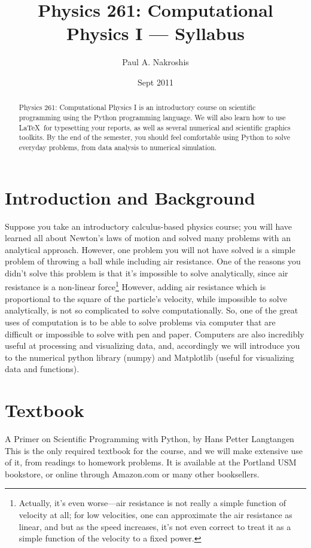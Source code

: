 \documentclass[justified]{tufte-handout}
\title{Physics 261: Computational Physics I --- Syllabus}
\author[Paul A. Nakroshis]{Paul A. Nakroshis}
\date{Sept 2011}  %
\begin{document}
\maketitle%

\begin{abstract}
\noindent Physics 261: Computational Physics I is an introductory course on
scientific programming using the Python programming language. We will also 
learn how to use \LaTeX\ for typesetting 
your reports, as well as several numerical and scientific graphics toolkits. By the 
end of the semester, you should feel comfortable using Python to solve everyday 
problems, from data analysis to numerical simulation. 
 \end{abstract}

\section{Introduction and Background}\label{sec:page-layout}
Suppose you take an introductory calculus-based physics course; you will 
have learned all about Newton's laws of motion and solved many problems
with an analytical approach. However, one problem you will not have solved
is a simple problem of throwing a ball while including air resistance. One of the reasons 
you didn't solve this problem is that it's impossible to solve analytically, since air resistance is 
a non-linear force\footnote{Actually, it's even worse---air resistance is not really a simple function of velocity at all; for low velocities, one can approximate the air resistance as linear, and but as the speed increases, it's not even correct to treat it as a simple function of the velocity to a fixed power.} However, adding air resistance which is proportional to the square of the particle's velocity, while impossible to solve analytically, is  
not so complicated to solve computationally. So, one of the great uses of computation is to be able to solve problems 
via computer that are difficult or impossible to solve with pen and paper. Computers are also incredibly useful at processing and visualizing data, and, accordingly we will introduce you to the numerical python library (numpy) and Matplotlib (useful for visualizing data and functions). 

\section{Textbook}
A Primer on Scientific Programming with Python, by Hans Petter Langtangen\\
This is the only required textbook for the course, and we will make
extensive use of it, from readings to homework problems. It is available
at the Portland USM bookstore, or online through Amazon.com or many other booksellers. 
\end{document}
